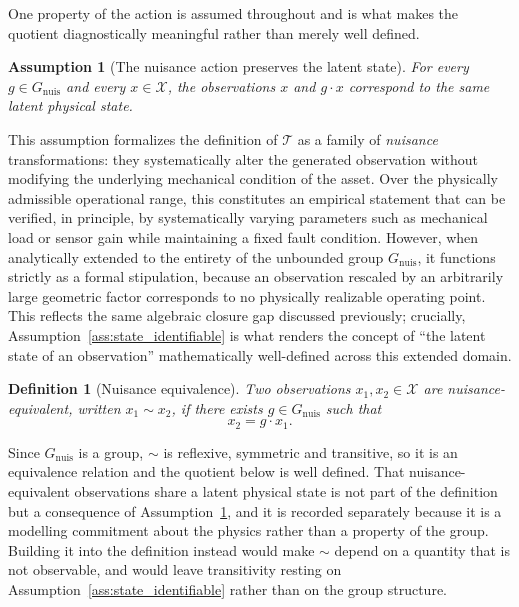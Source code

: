\documentclass[a4paper]{cas-sc}
\newtheorem{definition}{Definition}
\newtheorem{assumption}{Assumption}
\newcommand{\X}{\ensuremath{\mathcal{X}}}
\newcommand{\Gnuis}{\ensuremath{G_{\mathrm{nuis}}}}
\begin{document}
One property of the action is assumed throughout and is what makes the
quotient diagnostically meaningful rather than merely well defined.

\begin{assumption}[The nuisance action preserves the latent state]
\label{ass:action_preserves_state}
For every \(g\in\Gnuis\) and every \(x\in\X\), the observations \(x\) and
\(g\cdot x\) correspond to the same latent physical state.
\end{assumption}

This assumption formalizes the definition of \(\mathcal{T}\) as a family of \emph{nuisance} transformations: they systematically alter the generated observation without modifying the underlying mechanical condition of the asset. Over the physically admissible operational range, this constitutes an empirical statement that can be verified, in principle, by systematically varying parameters such as mechanical load or sensor gain while maintaining a fixed fault condition. However, when analytically extended to the entirety of the unbounded group \(\Gnuis\), it functions strictly as a formal stipulation, because an observation rescaled by an arbitrarily large geometric factor corresponds to no physically realizable operating point. This reflects the same algebraic closure gap discussed previously; crucially, Assumption~\ref{ass:state_identifiable} is what renders the concept of ``the latent state of an observation'' mathematically well-defined across this extended domain.

\begin{definition}[Nuisance equivalence]
\label{def:nuisance_equivalence}
Two observations \(x_1,x_2 \in \X\) are \emph{nuisance-equivalent}, written
\(x_1 \sim x_2\), if there exists \(g \in \Gnuis\) such that
\begin{equation}
x_2 = g \cdot x_1 .
\label{eq:equivalence}
\end{equation}
\end{definition}

Since \(\Gnuis\) is a group, \(\sim\) is reflexive, symmetric and transitive,
so it is an equivalence relation and the quotient below is well defined. That
nuisance-equivalent observations share a latent physical state is not part of
the definition but a consequence of
Assumption~\ref{ass:action_preserves_state}, and it is recorded separately
because it is a modelling commitment about the physics rather than a property
of the group. Building it into the definition instead would make \(\sim\)
depend on a quantity that is not observable, and would leave transitivity
resting on Assumption~\ref{ass:state_identifiable} rather than on the group
structure.
\end{document}
